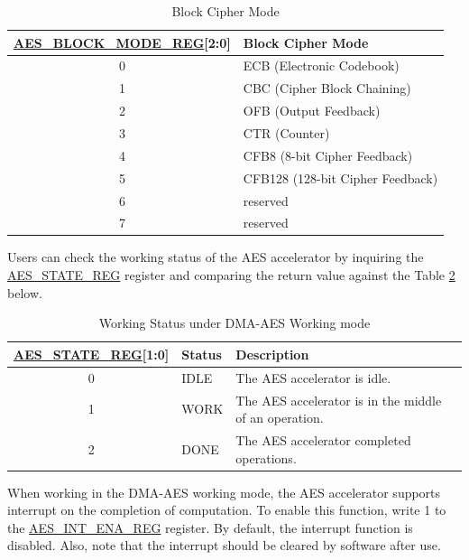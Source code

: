 \documentclass[main\_\_EN.tex]{subfiles}
\begin{document}
\begin{longtable}[c]{ | c | l | }
\caption{Block Cipher Mode}
\label{tab:aes-block-mode}
\\\hline 
\rowcolor{lightgray}
\textbf{\hyperref[regdesc:AESBLOCKMODEREG]{AES\_BLOCK\_MODE\_REG}[2:0]}     & \textbf{Block Cipher Mode}\\
    \hline
    0                          & ECB (Electronic Codebook)    \\
    \hline
    1                          & CBC (Cipher Block Chaining)     \\
    \hline
    2                          & OFB (Output Feedback)    \\
    \hline
    3                          & CTR (Counter)    \\
    \hline
    4                          & CFB8 (8-bit Cipher Feedback)    \\
    \hline
    5                          & CFB128 (128-bit Cipher Feedback) \\
    \hline
    6                         & reserved \\
    \hline
    7                         & reserved \\
    \hline
\end{longtable}

Users can check the working status of the AES accelerator by inquiring the \hyperref[regdesc:AESSTATEREG]{AES\_STATE\_REG} register and comparing the return value against the Table \ref{tab:aes-state-value-dma} below.

\clearpage
\begin{longtable}[c]{ | c | l | l | }
\caption{Working Status under DMA-AES Working mode}
\label{tab:aes-state-value-dma}
\\\hline 
\rowcolor{lightgray}
\textbf{\hyperref[regdesc:AESSTATEREG]{AES\_STATE\_REG}[1:0]} & \textbf{Status} &  \textbf{Description} \\ \hline

    0                   & IDLE      &   The AES accelerator is idle.\\ \hline
    1                   & WORK      &   The AES accelerator is in the middle of an operation.     \\ \hline
    2                   & DONE      &   The AES accelerator completed operations.     \\ \hline
\end{longtable}

When working in the DMA-AES working mode, the AES accelerator supports interrupt on the completion of computation. To enable this function, write 1 to the \hyperref[regdesc:AESINTENAREG]{AES\_INT\_ENA\_REG} register. By default, the interrupt function is disabled. Also, note that the interrupt should be cleared by software after use.
\end{document}

